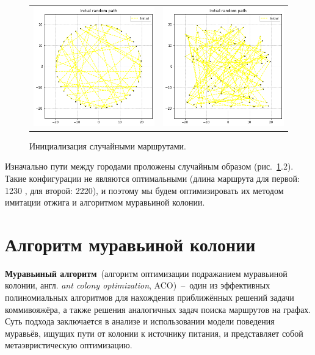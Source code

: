 \documentclass[12pt, a4paper]{article}
\begin{document}
    \begin{figure}[h!]
        \center
        \begin{tabular}{cc}
            \includegraphics[width = 6cm]{dots1_2.png} &
            \includegraphics[width = 6cm]{dots2_2.png} \\
        \end{tabular}
        \label{image22}
        \caption{Инициализация случайными маршрутами.}
    \end{figure}
    
    Изначально пути между городами проложены случайным образом 
    (рис.~\ref{image22}.2). Такие конфигурации не являются оптимальными 
    (длина маршрута для первой: 1230 , для второй: 2220), и поэтому мы будем 
    оптимизировать их методом имитации отжига и алгоритмом муравьиной 
    колонии.
    
    \section{Алгоритм муравьиной колонии}
    
    \textbf{Муравьиный алгоритм}~(алгоритм оптимизации подражанием 
    муравьиной колонии, англ. \textit{ant colony optimization}, ACO)~--~один 
    из эффективных полиномиальных алгоритмов для нахождения приближённых 
    решений задачи коммивояжёра, а также решения аналогичных задач поиска 
    маршрутов на графах. Суть подхода заключается в анализе и использовании 
    модели поведения муравьёв, ищущих пути от колонии к источнику питания, и 
    представляет собой метаэвристическую оптимизацию.
    
\end{document}
